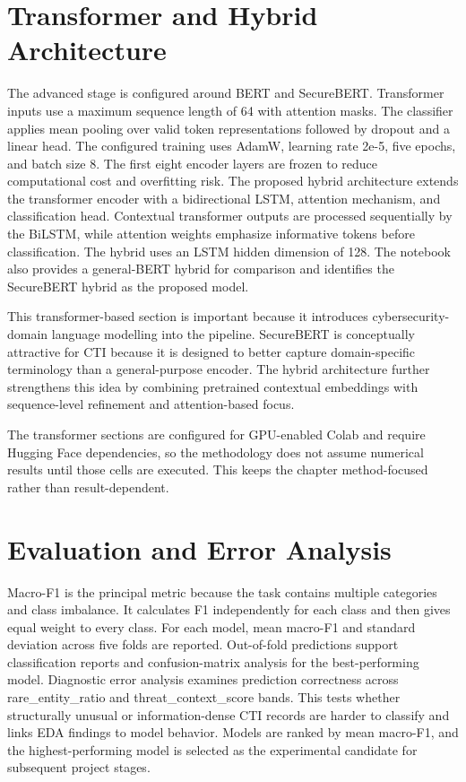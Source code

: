 \documentclass[12pt,a4paper]{report}
\begin{document}
\section{Transformer and Hybrid
Architecture}\label{transformer-and-hybrid-architecture}

The advanced stage is configured around BERT and SecureBERT. Transformer
inputs use a maximum sequence length of 64 with attention masks. The
classifier applies mean pooling over valid token representations
followed by dropout and a linear head. The configured training uses
AdamW, learning rate 2e-5, five epochs, and batch size 8. The first
eight encoder layers are frozen to reduce computational cost and
overfitting risk. The proposed hybrid architecture extends the
transformer encoder with a bidirectional LSTM, attention mechanism, and
classification head. Contextual transformer outputs are processed
sequentially by the BiLSTM, while attention weights emphasize
informative tokens before classification. The hybrid uses an LSTM hidden
dimension of 128. The notebook also provides a general-BERT hybrid for
comparison and identifies the SecureBERT hybrid as the proposed model.

This transformer-based section is important because it introduces
cybersecurity-domain language modelling into the pipeline. SecureBERT is
conceptually attractive for CTI because it is designed to better capture
domain-specific terminology than a general-purpose
encoder\cite{securebert2022}. The hybrid architecture further
strengthens this idea by combining pretrained contextual embeddings with
sequence-level refinement and attention-based focus.

The transformer sections are configured for GPU-enabled Colab and
require Hugging Face dependencies, so the methodology does not assume
numerical results until those cells are executed. This keeps the chapter
method-focused rather than result-dependent.
\section{Evaluation and Error
Analysis}\label{evaluation-and-error-analysis}

Macro-F1 is the principal metric because the task contains multiple
categories and class imbalance. It calculates F1 independently for each
class and then gives equal weight to every class. For each model, mean
macro-F1 and standard deviation across five folds are reported.
Out-of-fold predictions support classification reports and
confusion-matrix analysis for the best-performing model. Diagnostic
error analysis examines prediction correctness across
rare\_entity\_ratio and threat\_context\_score bands. This tests whether
structurally unusual or information-dense CTI records are harder to
classify and links EDA findings to model behavior. Models are ranked by
mean macro-F1, and the highest-performing model is selected as the
experimental candidate for subsequent project stages.
\end{document}
